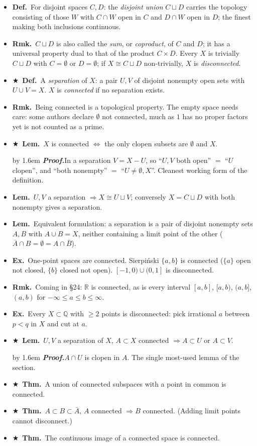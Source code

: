 \documentclass[12pt,a4paper]{article}
\newcommand{\Dfn}{\textbf{Def.}~}
\newcommand{\Thm}{\textbf{Thm.}~}
\newcommand{\Lem}{\textbf{Lem.}~}
\newcommand{\Exa}{\textbf{Ex.}~}
\newcommand{\Rmk}{\textbf{Rmk.}~}
\newcommand{\Key}{$\bigstar$~}                  %
\newcommand{\Pf}[1]{%
  \par\addvspace{7pt}\nopagebreak
  \begingroup
    \advance\leftskip by 1.6em
    \parindent=0pt \small\color{prf}%
    \textbf{\textit{Proof.}}\enspace #1\par
  \endgroup
  \addvspace{9pt}}
\newenvironment{BL}%
  {\begin{itemize}[leftmargin=1.4em,labelsep=0.55em,itemsep=11pt,topsep=11pt,parsep=0pt]}%
  {\end{itemize}}
\newcommand{\RR}{\mathbb{R}}
\newcommand{\QQ}{\mathbb{Q}}
\renewcommand{\iff}{\Leftrightarrow}
\newcommand{\imp}{\Rightarrow}
\begin{document}
\begin{BL}
\item \Dfn For disjoint spaces $C,D$: the \emph{disjoint union} $C\sqcup D$ carries the
      topology consisting of those $W$ with $C\cap W$ open in $C$ and $D\cap W$ open in $D$;
      the finest making both inclusions continuous.
\item \Rmk $C\sqcup D$ is also called the \emph{sum}, or \emph{coproduct}, of $C$ and $D$;
      it has a universal property dual to that of the product $C\times D$.
      Every $X$ is trivially $C\sqcup D$ with $C=\emptyset$ or $D=\emptyset$;
      if $X\cong C\sqcup D$ non-trivially, $X$ is \emph{disconnected}.
\item \Key\Dfn A \emph{separation} of $X$: a pair $U,V$ of disjoint nonempty open sets with
      $U\cup V=X$. $X$ is \emph{connected} if no separation exists.
\item \Rmk Being connected is a topological property. The empty space needs care: some authors
      declare $\emptyset$ not connected, much as $1$ has no proper factors yet is not counted
      as a prime.
\item \Key\Lem $X$ is connected $\iff$ the only clopen subsets are $\emptyset$ and $X$.
\Pf{In a separation $V=X-U$, so ``$U,V$ both open'' $=$ ``$U$ clopen'', and ``both nonempty''
$=$ ``$U\neq\emptyset,X$''. Cleanest working form of the definition.}
\item \Lem $U,V$ a separation $\imp X\cong U\sqcup V$; conversely $X=C\sqcup D$ with both
      nonempty gives a separation.
\item \Lem Equivalent formulation: a separation is a pair of disjoint nonempty sets
      $A,B$ with $A\cup B=X$, neither containing a limit point of the other
      ($\bar A\cap B=\emptyset=A\cap\bar B$).
\item \Exa One-point spaces are connected.
      Sierpi\'nski $\{a,b\}$ is connected ($\{a\}$ open not closed, $\{b\}$ closed not open).
      $[-1,0)\cup(0,1]$ is disconnected.
\item \Rmk Coming in \S24: $\RR$ is connected, as is every interval
      $[a,b]$, $[a,b)$, $(a,b]$, $(a,b)$ for $-\infty\le a\le b\le\infty$.
\item \Exa Every $X\subset\QQ$ with $\ge2$ points is disconnected:
      pick irrational $a$ between $p<q$ in $X$ and cut at $a$.
\item \Key\Lem $U,V$ a separation of $X$, $A\subset X$ connected $\imp A\subset U$ or $A\subset V$.
\Pf{$A\cap U$ is clopen in $A$. The single most-used lemma of the section.}
\item \Key\Thm A union of connected subspaces with a point in common is connected.
\item \Key\Thm $A\subset B\subset\bar A$, $A$ connected $\imp B$ connected.
      (Adding limit points cannot disconnect.)
\item \Key\Thm The continuous image of a connected space is connected.
\end{BL}
\end{document}
